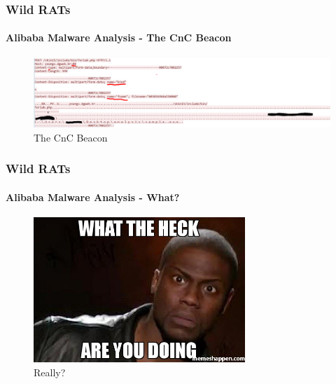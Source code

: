 \documentclass[aspectratio=169]{beamer}
\begin{document}
\begin{frame}
  \frametitle{Wild RATs}
  \framesubtitle{Alibaba Malware Analysis - The CnC Beacon}
  \begin{center}
    \begin{figure}
      \includegraphics[width=14cm,keepaspectratio]{alibaba_http_highlight}
      \caption{The CnC Beacon}
    \end{figure}
  \end{center}
\end{frame}

\begin{frame}
  \frametitle{Wild RATs}
  \framesubtitle{Alibaba Malware Analysis - What?}
  \begin{center}
    \begin{figure}
      \includegraphics[width=8cm,keepaspectratio]{what_are_you_doing}
      \caption{Really?}
    \end{figure}
  \end{center}
\end{frame}
\end{document}
